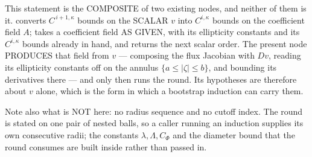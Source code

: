 \begin{lemma}
This statement is the COMPOSITE of two existing nodes, and neither of them is it.
 converts $C^{\,i+1,\kappa}$ bounds on the SCALAR $v$ into
$C^{i,\kappa}$ bounds on the coefficient field $A$;  takes a coefficient
field AS GIVEN, with its ellipticity constants and its $C^{i,\kappa}$ bounds already in hand, and
returns the next scalar order.  The present node PRODUCES that field from $v$ --- composing the
flux Jacobian with $Dv$, reading its ellipticity constants off  on
the annulus $\{a\le\lvert\zeta\rvert\le b\}$, and bounding its derivatives there --- and only
then runs the round.  Its hypotheses are therefore about $v$ alone, which is the form in which a
bootstrap induction can carry them.

Note also what is NOT here: no radius sequence and no cutoff index.  The round is stated on one
pair of nested balls, so a caller running an induction supplies its own consecutive radii; the
constants $\lambda,\Lambda,C_\Phi$ and the diameter bound that the round consumes are built
inside rather than passed in.
\end{lemma}
